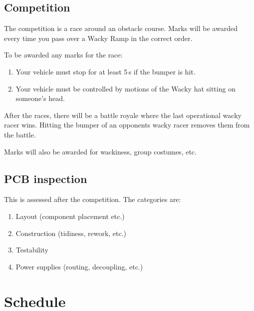 \documentclass[11pt, a4paper]{article}
\begin{document}
\subsection{Competition}

The competition is a race around an obstacle course.  Marks will be
awarded every time you pass over a Wacky Ramp in the correct order.


To be awarded any marks for the race:
%
\begin{enumerate}
\item Your vehicle must stop for at least 5\,s if the bumper is hit.

\item Your vehicle must be controlled by motions of the Wacky hat
  sitting on someone's head.
\end{enumerate}

After the races, there will be a battle royale where the last
operational wacky racer wins.  Hitting the bumper of an opponents
wacky racer removes them from the battle.

Marks will also be awarded for wackiness, group costumes, etc.




\subsection{PCB inspection}

This is assessed after the competition.  The categories are:
%
\begin{enumerate}
\item Layout (component placement etc.)
\item Construction (tidiness, rework, etc.)
\item Testability
\item Power supplies (routing, decoupling, etc.)
\end{enumerate}


\vfill\pagebreak
\section{Schedule}
\end{document}
